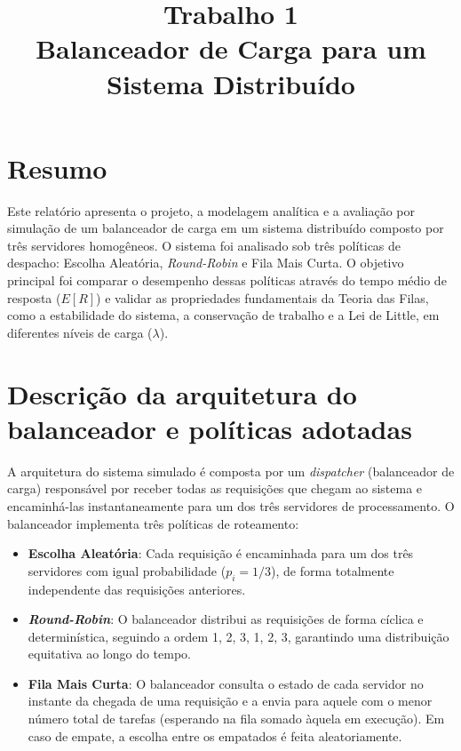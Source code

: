 \documentclass[conference]{IEEE_Conference_Template/IEEEtran}
\begin{document}
\title{Trabalho 1\\
\large Balanceador de Carga para um Sistema Distribuído}

\author{
\and
{}
}

\maketitle
\thispagestyle{plain}
\pagestyle{plain}

\section{Resumo}
Este relatório apresenta o projeto, a modelagem analítica e a avaliação por simulação de um balanceador de carga em um sistema distribuído composto por três servidores homogêneos. O sistema foi analisado sob três políticas de despacho: Escolha Aleatória, \textit{Round-Robin} e Fila Mais Curta. O objetivo principal foi comparar o desempenho dessas políticas através do tempo médio de resposta ($E[R]$) e validar as propriedades fundamentais da Teoria das Filas, como a estabilidade do sistema, a conservação de trabalho e a Lei de Little, em diferentes níveis de carga ($\lambda$).

\section{Descrição da arquitetura do balanceador e políticas adotadas}
A arquitetura do sistema simulado é composta por um \textit{dispatcher} (balanceador de carga) responsável por receber todas as requisições que chegam ao sistema e encaminhá-las instantaneamente para um dos três servidores de processamento. O balanceador implementa três políticas de roteamento:
\begin{itemize}
    \item \textbf{Escolha Aleatória}: Cada requisição é encaminhada para um dos três servidores com igual probabilidade ($p_i = 1/3$), de forma totalmente independente das requisições anteriores.
    \item \textbf{\textit{Round-Robin}}: O balanceador distribui as requisições de forma cíclica e determinística, seguindo a ordem 1, 2, 3, 1, 2, 3, garantindo uma distribuição equitativa ao longo do tempo.
    \item \textbf{Fila Mais Curta}: O balanceador consulta o estado de cada servidor no instante da chegada de uma requisição e a envia para aquele com o menor número total de tarefas (esperando na fila somado àquela em execução). Em caso de empate, a escolha entre os empatados é feita aleatoriamente.
\end{itemize}
\end{document}
